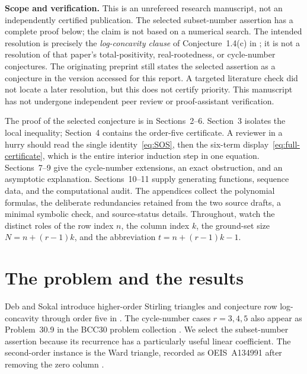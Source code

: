 \documentclass[11pt,a4paper]{article}
\numberwithin{equation}{section}
\theoremstyle{definition}
\theoremstyle{remark}
\begin{document}
\begin{tcolorbox}
\textbf{Scope and verification.} This is an unrefereed research manuscript,
not an independently certified publication. The selected subset-number
assertion has a complete proof below; the claim is not based on a numerical
search. The intended resolution is precisely the \emph{log-concavity clause}
of Conjecture~1.4(c) in \cite{DebSokal}; it is not a resolution of that
paper's total-positivity, real-rootedness, or cycle-number conjectures.
The originating preprint still states the selected assertion as a conjecture
in the version accessed for this report. A targeted literature check did not
locate a later resolution, but this does not certify priority. This
manuscript has not undergone independent peer review or proof-assistant
verification.
\end{tcolorbox}
\newpage
\tableofcontents
\vspace{0.9cm}
\begin{tcolorbox}[title={\bfseries Reading guide},colbacktitle=SoftOlive,
 coltitle=OliveInk]
The proof of the selected conjecture is in Sections~2--6.
Section~3 isolates the local inequality; Section~4 contains the
order-five certificate. A reviewer in a hurry should read the single
identity~\eqref{eq:SOS}, then the six-term display~\eqref{eq:full-certificate},
which is the entire interior induction step in one equation.
Sections~7--9 give the cycle-number extensions, an exact obstruction, and
an asymptotic explanation. Sections~10--11 supply generating functions,
sequence data, and the computational audit. The appendices collect the
polynomial formulas, the deliberate redundancies retained from the two
source drafts, a minimal symbolic check, and source-status details.
Throughout, watch the distinct roles of the row index $n$, the column
index $k$, the ground-set size $N=n+(r-1)k$, and the abbreviation
$t=n+(r-1)k-1$.
\end{tcolorbox}
\newpage

\section{The problem and the results}\label{sec:results}

Deb and Sokal introduce higher-order Stirling triangles and conjecture
row log-concavity through order five in
\cite[Conjectures~1.3(c) and 1.4(c)]{DebSokal}.
The cycle-number cases $r=3,4,5$ also appear as Problem~30.9 in the
BCC30 problem collection \cite{Cameron}. We select the subset-number
assertion because its recurrence has a particularly useful linear
coefficient. The second-order instance is the Ward triangle, recorded
as OEIS~A134991 after removing the zero column \cite{OEIS}.
\end{document}
